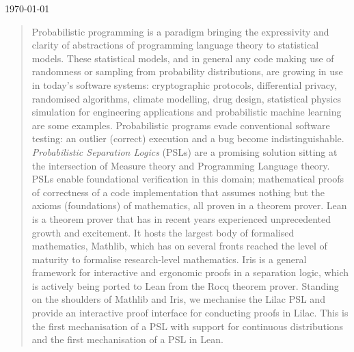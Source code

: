 \begin{titlepage}


{\large \today}\\[2cm] %

\vfill %

\end{titlepage}


\begin{abstract}
Probabilistic programming is a paradigm bringing the expressivity and clarity of abstractions of programming language theory to statistical models. These statistical
models, and in general any code making use of randomness or sampling from probability distributions, are growing in use in today's software systems: cryptographic protocols,
differential privacy, randomised algorithms, climate modelling, drug design, statistical physics simulation for engineering applications and probabilistic machine learning are some examples.
Probabilistic programs evade conventional software testing: an outlier (correct) execution and a bug become indistinguishable. \emph{Probabilistic Separation Logics} (PSLs) are a promising solution
sitting at the intersection of Measure theory and Programming Language theory. PSLs enable foundational verification in this domain; mathematical proofs of correctness of a code implementation that assumes nothing but the
axioms (foundations) of mathematics, all proven in a theorem prover. Lean is a theorem prover that has in recent years experienced unprecedented growth and excitement. It hosts the largest
body of formalised mathematics, Mathlib, which has on several fronts reached the level of maturity to formalise research-level mathematics. Iris is a general framework for interactive and ergonomic proofs
in a separation logic, which is actively being ported to Lean from the Rocq theorem prover. Standing on the shoulders of Mathlib and Iris, we mechanise the Lilac PSL and provide an interactive proof interface
for conducting proofs in Lilac. This is the first mechanisation of a PSL with support for continuous distributions and the first mechanisation of a PSL in Lean.
\end{abstract}

